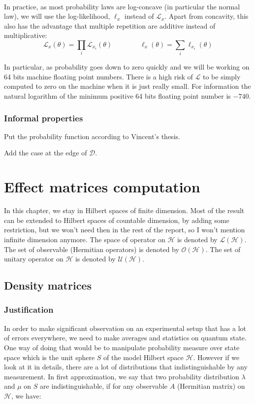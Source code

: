 \documentclass[10pt]{report}
\theoremstyle{plain}
\theoremstyle{definition}
\theoremstyle{remark}
\begin{document}
\

In practice, as most probability laws are log-concave (in particular the normal
law), we will use the log-likelihood, $\ell_x$ instead of $\mathcal{L}_x$. Apart
from concavity, this also has the advantage that multiple repetition are
additive instead of multiplicative:
\[\mathcal{L}_x(\theta) = \prod_i \mathcal{L}_{x_i}(\theta) \quad \quad \quad
  \quad \ell_x(\theta) = \sum_i \ell_{x_i}(\theta)\]

In particular, as probability goes down to zero quickly and we will be working on
64 bits machine floating point numbers. There is a high risk of $\mathcal{L}$ to
be simply computed to zero on the machine when it is just really small. For
information the natural logarithm of the minimum positive 64 bits floating point number
is $-740$.

\subsection{Informal properties}

Put the probability function according to Vincent's thesis.

Add the case at the edge of $\mathcal{D}$.

\chapter{Effect matrices computation}

In this chapter, we stay in Hilbert spaces of finite dimension. Most of the
result can be extended to Hilbert spaces of countable dimension, by adding
some restriction,
but we won't need then in the rest of the report, so I won't mention infinite
dimension anymore. The space of operator on
$\mathcal{H}$ is denoted by $\mathcal{L}(\mathcal{H})$. The set of observable
(Hermitian operators) is denoted by $\mathcal{O}(\mathcal{H})$. The set of
unitary operator on $\mathcal{H}$ is denoted by $\mathcal{U}(\mathcal{H})$.

\section{Density matrices}

\subsection{Justification}

In order to make significant observation on an experimental setup that has a lot
of errors everywhere, we need to make averages and statistics on quantum state.
One way of doing that would be to manipulate probability measure over state
space which is the unit sphere $S$ of the model Hilbert space $\mathcal{H}$. However if we look at
it in details, there are a lot of distributions that indistinguishable by any
measurement. In first approximation, we say that two probability distribution
$\lambda$ and $\mu$ on $S$ are indistinguishable,
if for any observable $A$ (Hermitian matrix) on $\mathcal{H}$, we
have:
\end{document}
